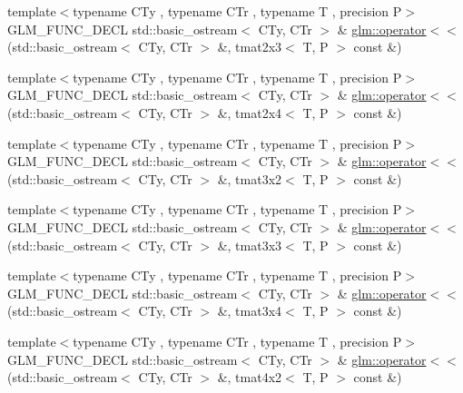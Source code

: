 \begin{DoxyCompactItemize}
\item 
{\footnotesize template$<$typename C\+Ty , typename C\+Tr , typename T , precision P$>$ }\\G\+L\+M\+\_\+\+F\+U\+N\+C\+\_\+\+D\+E\+C\+L std\+::basic\+\_\+ostream$<$ C\+Ty, C\+Tr $>$ \& \hyperlink{group__gtx__io_ga032043616f87c7eefaf4d83a20f779a5}{glm\+::operator$<$$<$} (std\+::basic\+\_\+ostream$<$ C\+Ty, C\+Tr $>$ \&, tmat2x3$<$ T, P $>$ const \&)
\item 
{\footnotesize template$<$typename C\+Ty , typename C\+Tr , typename T , precision P$>$ }\\G\+L\+M\+\_\+\+F\+U\+N\+C\+\_\+\+D\+E\+C\+L std\+::basic\+\_\+ostream$<$ C\+Ty, C\+Tr $>$ \& \hyperlink{group__gtx__io_ga1a2314cab31da0e736bc5e601bcb8f37}{glm\+::operator$<$$<$} (std\+::basic\+\_\+ostream$<$ C\+Ty, C\+Tr $>$ \&, tmat2x4$<$ T, P $>$ const \&)
\item 
{\footnotesize template$<$typename C\+Ty , typename C\+Tr , typename T , precision P$>$ }\\G\+L\+M\+\_\+\+F\+U\+N\+C\+\_\+\+D\+E\+C\+L std\+::basic\+\_\+ostream$<$ C\+Ty, C\+Tr $>$ \& \hyperlink{group__gtx__io_gac825ec168ada9209dad314bca460ceef}{glm\+::operator$<$$<$} (std\+::basic\+\_\+ostream$<$ C\+Ty, C\+Tr $>$ \&, tmat3x2$<$ T, P $>$ const \&)
\item 
{\footnotesize template$<$typename C\+Ty , typename C\+Tr , typename T , precision P$>$ }\\G\+L\+M\+\_\+\+F\+U\+N\+C\+\_\+\+D\+E\+C\+L std\+::basic\+\_\+ostream$<$ C\+Ty, C\+Tr $>$ \& \hyperlink{group__gtx__io_ga3ea3ca90bea2e763079f09af1e5d50ab}{glm\+::operator$<$$<$} (std\+::basic\+\_\+ostream$<$ C\+Ty, C\+Tr $>$ \&, tmat3x3$<$ T, P $>$ const \&)
\item 
{\footnotesize template$<$typename C\+Ty , typename C\+Tr , typename T , precision P$>$ }\\G\+L\+M\+\_\+\+F\+U\+N\+C\+\_\+\+D\+E\+C\+L std\+::basic\+\_\+ostream$<$ C\+Ty, C\+Tr $>$ \& \hyperlink{group__gtx__io_ga5a5ca6f99c027a2277b24de487198fe0}{glm\+::operator$<$$<$} (std\+::basic\+\_\+ostream$<$ C\+Ty, C\+Tr $>$ \&, tmat3x4$<$ T, P $>$ const \&)
\item 
{\footnotesize template$<$typename C\+Ty , typename C\+Tr , typename T , precision P$>$ }\\G\+L\+M\+\_\+\+F\+U\+N\+C\+\_\+\+D\+E\+C\+L std\+::basic\+\_\+ostream$<$ C\+Ty, C\+Tr $>$ \& \hyperlink{group__gtx__io_ga8ce3cf61260e62080a9596c2f10ab4a0}{glm\+::operator$<$$<$} (std\+::basic\+\_\+ostream$<$ C\+Ty, C\+Tr $>$ \&, tmat4x2$<$ T, P $>$ const \&)

\end{DoxyCompactItemize}
